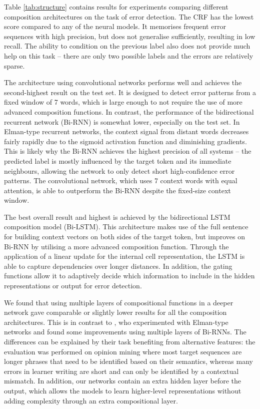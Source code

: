 \documentclass[11pt]{article}
\begin{document}
Table \ref{tab:structure} contains results for experiments comparing different composition architectures on the task of error detection.
The CRF has the lowest  score compared to any of the neural models. It memorises frequent error sequences with high precision, but does not generalise sufficiently, resulting in low recall.
The ability to condition on the previous label also does not provide much help on this task -- there are only two possible labels and the errors are relatively sparse.

The architecture using convolutional networks performs well and achieves the second-highest result on the test set. It is designed to detect error patterns from a fixed window of 7 words, which is large enough to not require the use of more advanced composition functions.
In contrast, the performance of the bidirectional recurrent network (Bi-RNN) is somewhat lower, especially on the test set.
In Elman-type recurrent networks, the context signal from distant words decreases fairly rapidly due to the sigmoid activation function and diminishing gradients. 
This is likely why the Bi-RNN achieves the highest precision of all systems -- the predicted label is mostly influenced by the target token and its immediate neighbours, allowing the network to only detect short high-confidence error patterns.
The convolutional network, which uses 7 context words with equal attention, is able to outperform the Bi-RNN despite the fixed-size context window.

The best overall result and highest  is achieved by the bidirectional LSTM composition model (Bi-LSTM). 
This architecture makes use of the full sentence for building context vectors on both sides of the target token, but improves on Bi-RNN by utilising a more advanced composition function. Through the application of a linear update for the internal cell representation, the LSTM is able to capture dependencies over longer distances. In addition, the gating functions allow it to adaptively decide which information to include in the hidden representations or output for error detection.

We found that using multiple layers of compositional functions in a deeper network gave comparable or slightly lower results for all the composition architectures. 
This is in contrast to , who experimented with Elman-type networks and found some improvements using multiple layers of Bi-RNNs.
The differences can be explained by their task benefiting from alternative features: the evaluation was performed on opinion mining where most target sequences are longer phrases that need to be identified based on their semantics, whereas many errors in learner writing are short and can only be identified by a contextual mismatch. In addition,
our networks contain an extra hidden layer before the output, which allows the models to learn higher-level representations without adding complexity through an extra compositional layer.
\end{document}
